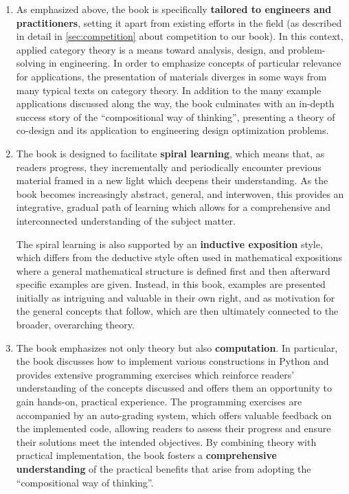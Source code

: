 \documentclass[10pt, article, one side]{memoir}
\begin{document}
    \begin{enumerate}
        \item As emphasized above, the book is specifically \textbf{tailored to engineers and practitioners}, setting it apart from existing efforts in the field (as described in detail in \cref{sec:competition} about competition to our book). In this context, applied category theory is a means toward analysis, design, and problem-solving in engineering. In order to emphasize concepts of particular relevance for applications, the presentation of materials diverges in some ways from many typical texts on category theory. In addition to the many example applications discussed along the way, the book culminates with an in-depth success story of the “compositional way of thinking”, presenting a theory of co-design and its application to engineering design optimization problems.
        
        \item 
        The book is designed to facilitate \textbf{spiral learning}, which means that, as readers progress, they incrementally and periodically encounter previous material framed in a new light which deepens their understanding. As the book becomes increasingly abstract, general, and interwoven, this provides an integrative, gradual path of learning which allows for a comprehensive and interconnected understanding of the subject matter.
        
        The spiral learning is also supported by an \textbf{inductive exposition} style, which differs from the deductive style often used in mathematical expositions where a general mathematical structure is defined first and then afterward specific examples are given. Instead, in this book, examples are presented initially as intriguing and valuable in their own right, and as motivation for the general concepts that follow, which are then ultimately connected to the broader, overarching theory.
             
                     \item The book emphasizes not only theory but also \textbf{computation}. In particular, the book discusses how to implement various constructions in Python and provides extensive programming exercises which reinforce readers' understanding of the concepts discussed and offers them an opportunity to gain hands-on, practical experience. The programming exercises are accompanied by an auto-grading system, which offers valuable feedback on the implemented code, allowing readers to assess their progress and ensure their solutions meet the intended objectives. By combining theory with practical implementation, the book fosters a \textbf{comprehensive understanding} of the practical benefits that arise from adopting the ``compositional way of thinking''.


\end{enumerate}
\end{document}
